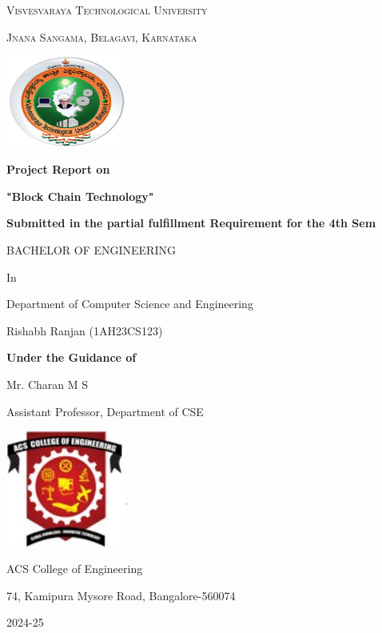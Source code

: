 \documentclass[12pt]{article}
\begin{document}
	\begin{titlepage}
		\centering
		\textsc{\Large Visvesvaraya Technological University}\par
		\textsc{Jnana Sangama, Belagavi, Karnataka} \par
		\vspace{1cm}
		\centering
		\includegraphics[width=0.3\textwidth]{vtu.png}
		
		\vspace{0.5cm}
		\textbf{\huge Project Report on}\par
		\vspace{0.5cm}
		\textbf{\Large "Block Chain Technology"}\par
		\vspace{0.5cm}
		\textbf{\large Submitted in the partial fulfillment Requirement for the 4th Sem}\par
		\vspace{0.5cm}
		{\Large BACHELOR OF ENGINEERING} \par
		In \par
		Department of Computer Science and Engineering \par
		{\large Rishabh Ranjan (1AH23CS123)\par
			\vspace{1cm}
			\textbf{\large Under the Guidance of }\par
			\vspace{0.5cm}
			Mr. Charan M S \par
			Assistant Professor, Department of CSE \par
			\vspace{0.5cm}
			\centering
			\includegraphics[width=0.3\textwidth]{acs.png}
			
			\vspace{0.5cm}
			{\Large ACS College of Engineering}\par
			74, Kamipura Mysore Road, Bangalore-560074 \par
			2024-25 \par
			\vspace{0.2cm}
		}
	\end{titlepage}
\end{document}
